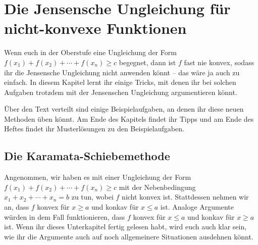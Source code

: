 \section{Die Jensensche Ungleichung für nicht-konvexe Funktionen}\label{kapitel:LCF}
Wenn euch in der Oberstufe eine Ungleichung der Form $f(x_1)+f(x_2)+\dotsb+f(x_n)\geqslant c$ begegnet, dann ist $f$ fast nie konvex, sodass ihr die Jensensche Ungleichung nicht anwenden könnt -- das wäre ja auch zu einfach. In diesem Kapitel lernt ihr einige Tricks, mit denen ihr bei solchen Aufgaben trotzdem mit der Jensenschen Ungleichung argumentieren könnt.

Über den Text verteilt sind einige Beispielaufgaben, an denen ihr diese neuen Methoden üben könnt. Am Ende des Kapitels findet ihr Tipps und am Ende des Heftes findet ihr Musterlösungen zu den Beispielaufgaben.

\subsection*{Die Karamata-Schiebemethode}
Angenommen, wir haben es mit einer Ungleichung der Form $f(x_1)+f(x_2)+\dotsb+f(x_n)\geqslant c$ mit der Nebenbedingung $x_1+x_2+\dotsb+x_n=b$ zu tun, wobei $f$ nicht konvex ist. Stattdessen nehmen wir an, dass $f$ konvex für $x\geqslant a$ und konkav für $x\leqslant a$ ist. Analoge Argumente würden in dem Fall funktionieren, dass $f$ konvex für $x\leqslant a$ und konkav für $x\geqslant a$ ist. Wenn ihr dieses Unterkapitel fertig gelesen habt, wird euch auch klar sein, wie ihr die Argumente auch auf noch allgemeinere Situationen ausdehnen könnt.

